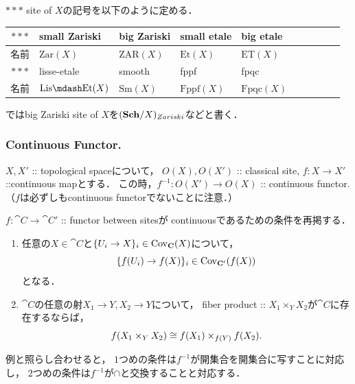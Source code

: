 \documentclass[a4paper, dvipdfmx]{jsarticle}
\begin{document}
\begin{Def}
    $***$ site of $X$の記号を以下のように定める．
\begin{table}[ht]
\begin{tabular}{c|lllllllll@{}}
    \toprule
    $***$ & small Zariski     & big Zariski       & small etale      & big etale\\ \midrule
    名前    & $\mathrm{Zar}(X)$ & $\mathrm{ZAR}(X)$ & $\mathrm{Et}(X)$ & $\mathrm{ET}(X)$ \\ \hline \hline
    $***$ & lisse-etale         & smooth           & fppf               & fpqc               \\ \midrule
    名前    & $\mathrm{Lis\mdash Et}(X)$ & $\mathrm{Sm}(X)$ & $\mathrm{Fppf}(X)$ & $\mathrm{Fpqc}(X)$ \\ \bottomrule
\end{tabular}
\end{table}

    \cite{SP}ではbig Zariski site of $X$を$(\mathbf{Sch}/X)_{Zariski}$などと書く．
\end{Def}


\subsubsection{Continuous Functor.}
\begin{Example}
    $X, X'$ :: topological spaceについて，
    $O(X), O(X')$ :: classical site,
    $f \colon X \to X'$ ::continuous mapとする．
    この時，$f^{-1} \colon O(X') \to O(X)$ :: continuous functor.
    （$f$は必ずしもcontinuous functorでないことに注意．）
\end{Example}

\begin{Remark}
    $f \colon \cat{C} \to \cat{C}'$ :: functor between sitesが
    continuousであるための条件を再掲する．
    \begin{enumerate}
        \item 
        任意の$X \in \cat{C}$と$\{U_i \to X\}_i \in \operatorname{Cov}_{\mathbf{C}}(X)$について，
        \[ \{ f(U_i) \to f(X) \}_i \in \operatorname{Cov}_{\mathbf{C}'}(f(X)) \]となる．

        \item
        $\cat{C}$の任意の射$X_1 \to Y, X_2 \to Y$について，
        fiber product :: $X_1 \times_Y X_2$が$\cat{C}$に存在するならば，
        \[ f(X_1 \times_Y X_2) \cong f(X_1) \times_{f(Y)} f(X_2). \]
    \end{enumerate}
    
    例と照らし合わせると，
    $1$つめの条件は$f^{-1}$が開集合を開集合に写すことに対応し，
    $2$つめの条件は$f^{-1}$が$\cap$と交換することと対応する．
\end{Remark}
\end{document}
